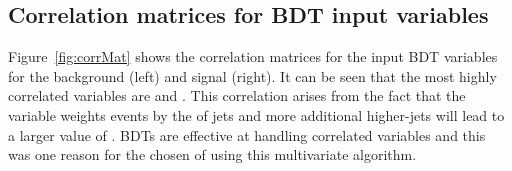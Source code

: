 

\subsection{Correlation matrices for BDT input variables}


Figure~\ref{fig:corrMat} shows the correlation matrices for the input BDT variables for the background \ttbar (left) and signal \tttt (right). It can be seen that the most highly correlated variables are \njetsw and \redhadmass. This correlation arises from the fact that the \njetsw variable weights events by the \pt of jets and more additional higher-\pt jets will lead to a larger value of \redhadmass. BDTs are effective at handling correlated variables and this was one reason for the chosen of using this multivariate algorithm.


